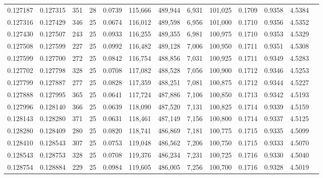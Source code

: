 \begin{tabular}{rrrrrrrrrrrrr}
0.127187 & 0.127315 & 351 &  28 &                                     0.0739 & 115,666 & 489,944 &   6,931 & 101,025 & 0.1709 & 0.9358 & 4.5384 \\
0.127316 & 0.127429 & 346 &  25 &                                     0.0674 & 116,012 & 489,598 &   6,956 & 101,000 & 0.1710 & 0.9356 & 4.5352 \\
0.127430 & 0.127507 & 243 &  25 &                                     0.0933 & 116,255 & 489,355 &   6,981 & 100,975 & 0.1710 & 0.9353 & 4.5329 \\
0.127508 & 0.127599 & 227 &  25 &                                     0.0992 & 116,482 & 489,128 &   7,006 & 100,950 & 0.1711 & 0.9351 & 4.5308 \\
0.127599 & 0.127700 & 272 &  25 &                                     0.0842 & 116,754 & 488,856 &   7,031 & 100,925 & 0.1711 & 0.9349 & 4.5283 \\
0.127702 & 0.127798 & 328 &  25 &                                     0.0708 & 117,082 & 488,528 &   7,056 & 100,900 & 0.1712 & 0.9346 & 4.5253 \\
0.127799 & 0.127887 & 277 &  25 &                                     0.0828 & 117,359 & 488,251 &   7,081 & 100,875 & 0.1712 & 0.9344 & 4.5227 \\
0.127888 & 0.127995 & 365 &  25 &                                     0.0641 & 117,724 & 487,886 &   7,106 & 100,850 & 0.1713 & 0.9342 & 4.5193 \\
0.127996 & 0.128140 & 366 &  25 &                                     0.0639 & 118,090 & 487,520 &   7,131 & 100,825 & 0.1714 & 0.9339 & 4.5159 \\
0.128143 & 0.128280 & 371 &  25 &                                     0.0631 & 118,461 & 487,149 &   7,156 & 100,800 & 0.1714 & 0.9337 & 4.5125 \\
0.128280 & 0.128409 & 280 &  25 &                                     0.0820 & 118,741 & 486,869 &   7,181 & 100,775 & 0.1715 & 0.9335 & 4.5099 \\
0.128410 & 0.128543 & 307 &  25 &                                     0.0753 & 119,048 & 486,562 &   7,206 & 100,750 & 0.1715 & 0.9333 & 4.5070 \\
0.128543 & 0.128753 & 328 &  25 &                                     0.0708 & 119,376 & 486,234 &   7,231 & 100,725 & 0.1716 & 0.9330 & 4.5040 \\
0.128754 & 0.128884 & 229 &  25 &                                     0.0984 & 119,605 & 486,005 &   7,256 & 100,700 & 0.1716 & 0.9328 & 4.5019 \\

\end{tabular}
